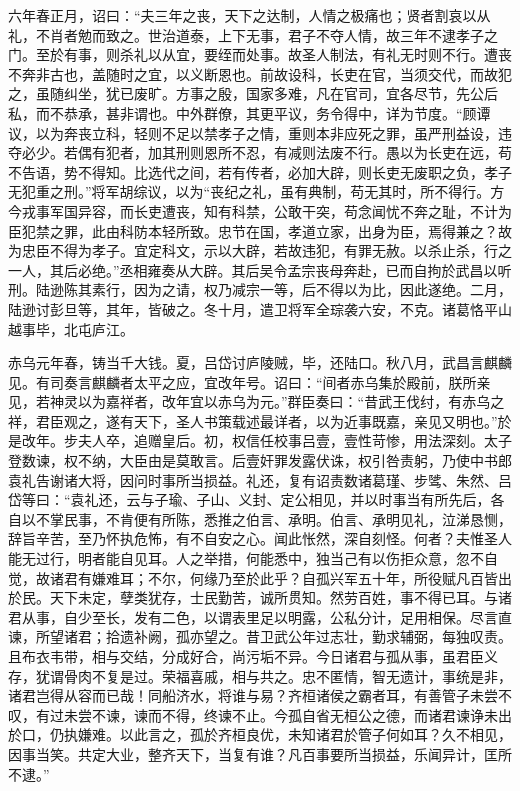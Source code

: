 \documentclass[12pt,UTF8]{ctexbook}
\begin{document}
六年春正月，诏曰：“夫三年之丧，天下之达制，人情之极痛也；贤者割哀以从礼，不肖者勉而致之。世治道泰，上下无事，君子不夺人情，故三年不逮孝子之门。至於有事，则杀礼以从宜，要绖而处事。故圣人制法，有礼无时则不行。遭丧不奔非古也，盖随时之宜，以义断恩也。前故设科，长吏在官，当须交代，而故犯之，虽随纠坐，犹已废旷。方事之殷，国家多难，凡在官司，宜各尽节，先公后私，而不恭承，甚非谓也。中外群僚，其更平议，务令得中，详为节度。“顾谭议，以为奔丧立科，轻则不足以禁孝子之情，重则本非应死之罪，虽严刑益设，违夺必少。若偶有犯者，加其刑则恩所不忍，有减则法废不行。愚以为长吏在远，苟不告语，势不得知。比选代之间，若有传者，必加大辟，则长吏无废职之负，孝子无犯重之刑。”将军胡综议，以为“丧纪之礼，虽有典制，苟无其时，所不得行。方今戎事军国异容，而长吏遭丧，知有科禁，公敢干突，苟念闻忧不奔之耻，不计为臣犯禁之罪，此由科防本轻所致。忠节在国，孝道立家，出身为臣，焉得兼之？故为忠臣不得为孝子。宜定科文，示以大辟，若故违犯，有罪无赦。以杀止杀，行之一人，其后必绝。”丞相雍奏从大辟。其后吴令孟宗丧母奔赴，已而自拘於武昌以听刑。陆逊陈其素行，因为之请，权乃减宗一等，后不得以为比，因此遂绝。二月，陆逊讨彭旦等，其年，皆破之。冬十月，遣卫将军全琮袭六安，不克。诸葛恪平山越事毕，北屯庐江。

赤乌元年春，铸当千大钱。夏，吕岱讨庐陵贼，毕，还陆口。秋八月，武昌言麒麟见。有司奏言麒麟者太平之应，宜改年号。诏曰：“间者赤乌集於殿前，朕所亲见，若神灵以为嘉祥者，改年宜以赤乌为元。”群臣奏曰：“昔武王伐纣，有赤乌之祥，君臣观之，遂有天下，圣人书策载述最详者，以为近事既嘉，亲见又明也。”於是改年。步夫人卒，追赠皇后。初，权信任校事吕壹，壹性苛惨，用法深刻。太子登数谏，权不纳，大臣由是莫敢言。后壹奸罪发露伏诛，权引咎责躬，乃使中书郎袁礼告谢诸大将，因问时事所当损益。礼还，复有诏责数诸葛瑾、步骘、朱然、吕岱等曰：“袁礼还，云与子瑜、子山、义封、定公相见，并以时事当有所先后，各自以不掌民事，不肯便有所陈，悉推之伯言、承明。伯言、承明见礼，泣涕恳恻，辞旨辛苦，至乃怀执危怖，有不自安之心。闻此怅然，深自刻怪。何者？夫惟圣人能无过行，明者能自见耳。人之举措，何能悉中，独当己有以伤拒众意，忽不自觉，故诸君有嫌难耳；不尔，何缘乃至於此乎？自孤兴军五十年，所役赋凡百皆出於民。天下未定，孽类犹存，士民勤苦，诚所贯知。然劳百姓，事不得已耳。与诸君从事，自少至长，发有二色，以谓表里足以明露，公私分计，足用相保。尽言直谏，所望诸君；拾遗补阙，孤亦望之。昔卫武公年过志壮，勤求辅弼，每独叹责。且布衣韦带，相与交结，分成好合，尚污垢不异。今日诸君与孤从事，虽君臣义存，犹谓骨肉不复是过。荣福喜戚，相与共之。忠不匿情，智无遗计，事统是非，诸君岂得从容而已哉！同船济水，将谁与易？齐桓诸侯之霸者耳，有善管子未尝不叹，有过未尝不谏，谏而不得，终谏不止。今孤自省无桓公之德，而诸君谏诤未出於口，仍执嫌难。以此言之，孤於齐桓良优，未知诸君於管子何如耳？久不相见，因事当笑。共定大业，整齐天下，当复有谁？凡百事要所当损益，乐闻异计，匡所不逮。”
\end{document}
